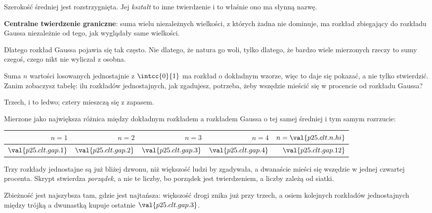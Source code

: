 \begin{fr}
Szerokość średniej jest rozstrzygnięta. Jej \emph{kształt} to inne
twierdzenie i to właśnie ono ma słynną nazwę.

\textbf{Centralne twierdzenie graniczne}: suma wielu niezależnych wielkości,
z których żadna nie dominuje, ma rozkład zbiegający do rozkładu Gaussa
\dash{} niezależnie od tego, jak wyglądały same wielkości.

Dlatego rozkład Gaussa pojawia się tak często. Nie dlatego, że natura go
woli, tylko dlatego, że bardzo wiele mierzonych rzeczy to sumy czegoś, czego
nikt nie wyliczał z osobna.

Suma $n$ wartości losowanych jednostajnie z $\intcc{0}{1}$ ma rozkład o
dokładnym wzorze, więc to daje się pokazać, a nie tylko stwierdzić. Zanim
zobaczysz tabelę: ilu rozkładów jednostajnych, jak zgadujesz, potrzeba, żeby
wszędzie mieścić się w procencie od rozkładu Gaussa?
\dotline
\nextframe
\end{fr}

\begin{fr}
\begin{ansblock}
Trzech, i to ledwo; cztery mieszczą się z zapasem.
\end{ansblock}

Mierzone jako największa różnica między dokładnym rozkładem a rozkładem
Gaussa o tej samej średniej i tym samym rozrzucie:

\begin{center}
\begin{tabular}{rrrrr}
\toprule
$n = 1$ & $n = 2$ & $n = 3$ & $n = 4$ & $n = \val{p25.clt.n.hi}$ \\
\midrule
$\val{p25.clt.gap.1}$ & $\val{p25.clt.gap.2}$ & $\val{p25.clt.gap.3}$ &
$\val{p25.clt.gap.4}$ & $\val{p25.clt.gap.12}$ \\
\bottomrule
\end{tabular}
\end{center}

Trzy rozkłady jednostajne są już bliżej dzwonu, niż większość ludzi by
zgadywała, a dwanaście mieści się wszędzie w jednej czwartej procenta. Skrypt
stwierdza \emph{porządek}, a nie te liczby, bo porządek jest twierdzeniem, a
liczby zależą od siatki.

Zbieżność jest najszybsza tam, gdzie jest najtańsza: większość drogi znika już
przy trzech, a osiem kolejnych rozkładów jednostajnych między trójką a
dwunastką kupuje ostatnie $\val{p25.clt.gap.3}$.
\end{fr}

